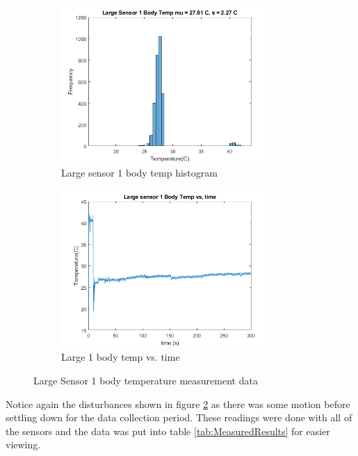 \documentclass[12pt,a4paper]{report}
\begin{document}
\begin{figure}[h!]
\begin{subfigure}{0.5\textwidth}
    \includegraphics[width=1\linewidth, height=6cm]{Images/Large1ArmHist.png}
    \caption{Large sensor 1 body temp histogram}
    \label{fig:Large1bodyHist}
\end{subfigure}
\begin{subfigure}{0.5\textwidth}
    \includegraphics[width=1\linewidth, height=6cm]{Images/Large1ArmTime.png}
    \caption{Large 1 body temp vs. time}
    \label{fig:Large1bodyTime}
\end{subfigure}
\caption{Large Sensor 1 body temperature measurement data}
\label{LargeSensor1Body}
\end{figure}

Notice again the disturbances shown in figure \ref{fig:Large1bodyTime} as there was some motion before settling down for the data collection period. These readings were done with all of the sensors and the data was put into table \ref{tab:MeasuredResults} for easier viewing.
\end{document}
